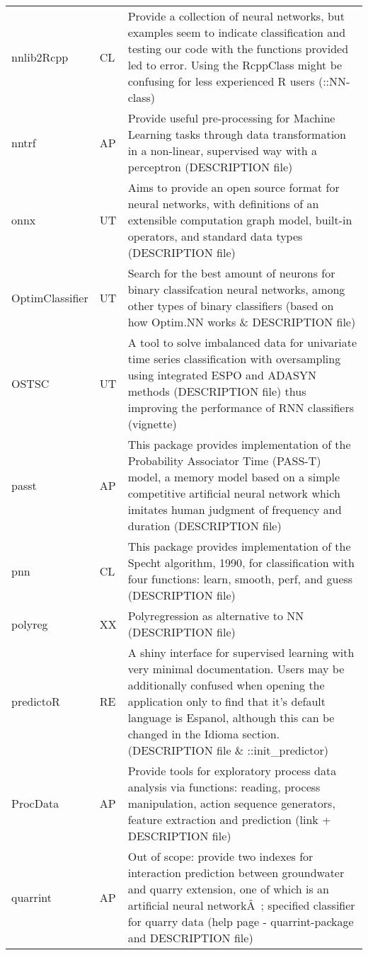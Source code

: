 \begin{Schunk}
\begin{longtable}[t]{ll>{\raggedright\arraybackslash}p{10cm}}
nnlib2Rcpp & CL & Provide a collection of neural networks, but examples seem to indicate classification and testing our code with the functions provided led to error. Using the RcppClass might be confusing for less experienced R users (::NN-class)\\
nntrf & AP & Provide useful pre-processing for Machine Learning tasks through data transformation in a non-linear, supervised way with a perceptron (DESCRIPTION file)\\
onnx & UT & Aims to provide an open source format for neural networks, with definitions of an extensible computation graph model, built-in operators, and standard data types (DESCRIPTION file)\\
\addlinespace
OptimClassifier & UT & Search for the best amount of neurons for binary classifcation neural networks, among other types of binary classifiers (based on how Optim.NN works \& DESCRIPTION file)\\
OSTSC & UT & A tool to solve imbalanced data for univariate time series classification with oversampling using integrated ESPO and ADASYN methods (DESCRIPTION file) thus improving the performance of RNN classifiers (vignette)\\
passt & AP & This package provides implementation of the Probability Associator Time (PASS-T) model, a memory model based on a simple competitive artificial neural network which imitates human judgment of frequency and duration (DESCRIPTION file)\\
pnn & CL & This package provides implementation of the Specht algorithm, 1990, for classification with four functions: learn, smooth, perf, and guess (DESCRIPTION file)\\
polyreg & XX & Polyregression as alternative to NN (DESCRIPTION file)\\
\addlinespace
predictoR & RE & A shiny interface for supervised learning with very minimal documentation. Users may be additionally confused when opening the application only to find that it's default language is Espanol, although this can be changed in the Idioma section. (DESCRIPTION file \& ::init\_predictor)\\
ProcData & AP & Provide tools for exploratory process data analysis via functions: reading, process manipulation, action sequence generators, feature extraction and prediction (link + DESCRIPTION file)\\
quarrint & AP & Out of scope: provide two indexes for interaction prediction between groundwater and quarry extension, one of which is an artificial neural networkÂ ; specified classifier for quarry data (help page - quarrint-package and DESCRIPTION file)\\

\end{longtable}
\end{Schunk}
